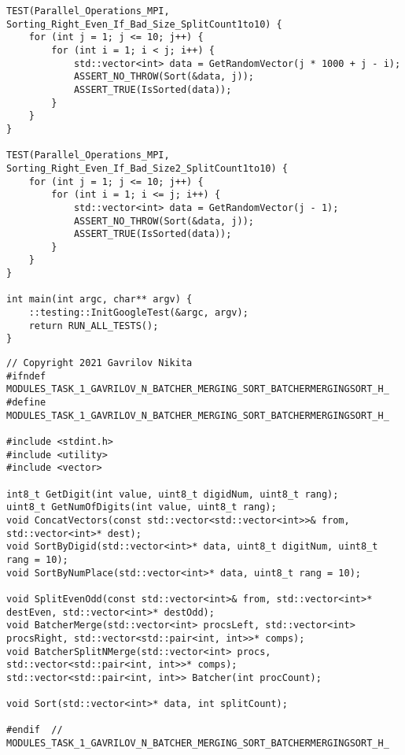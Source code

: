 \documentclass{report}
\begin{document}
\begin{lstlisting}
TEST(Parallel_Operations_MPI, Sorting_Right_Even_If_Bad_Size_SplitCount1to10) {
    for (int j = 1; j <= 10; j++) {
        for (int i = 1; i < j; i++) {
            std::vector<int> data = GetRandomVector(j * 1000 + j - i);
            ASSERT_NO_THROW(Sort(&data, j));
            ASSERT_TRUE(IsSorted(data));
        }
    }
}

TEST(Parallel_Operations_MPI, Sorting_Right_Even_If_Bad_Size2_SplitCount1to10) {
    for (int j = 1; j <= 10; j++) {
        for (int i = 1; i <= j; i++) {
            std::vector<int> data = GetRandomVector(j - 1);
            ASSERT_NO_THROW(Sort(&data, j));
            ASSERT_TRUE(IsSorted(data));
        }
    }
}

int main(int argc, char** argv) {
    ::testing::InitGoogleTest(&argc, argv);
    return RUN_ALL_TESTS();
}

\end{lstlisting}
\begin{lstlisting}
// Copyright 2021 Gavrilov Nikita
#ifndef MODULES_TASK_1_GAVRILOV_N_BATCHER_MERGING_SORT_BATCHERMERGINGSORT_H_
#define MODULES_TASK_1_GAVRILOV_N_BATCHER_MERGING_SORT_BATCHERMERGINGSORT_H_

#include <stdint.h>
#include <utility>
#include <vector>

int8_t GetDigit(int value, uint8_t digidNum, uint8_t rang);
uint8_t GetNumOfDigits(int value, uint8_t rang);
void ConcatVectors(const std::vector<std::vector<int>>& from, std::vector<int>* dest);
void SortByDigid(std::vector<int>* data, uint8_t digitNum, uint8_t rang = 10);
void SortByNumPlace(std::vector<int>* data, uint8_t rang = 10);

void SplitEvenOdd(const std::vector<int>& from, std::vector<int>* destEven, std::vector<int>* destOdd);
void BatcherMerge(std::vector<int> procsLeft, std::vector<int> procsRight, std::vector<std::pair<int, int>>* comps);
void BatcherSplitNMerge(std::vector<int> procs, std::vector<std::pair<int, int>>* comps);
std::vector<std::pair<int, int>> Batcher(int procCount);

void Sort(std::vector<int>* data, int splitCount);

#endif  // MODULES_TASK_1_GAVRILOV_N_BATCHER_MERGING_SORT_BATCHERMERGINGSORT_H_

\end{lstlisting}
\end{document}
